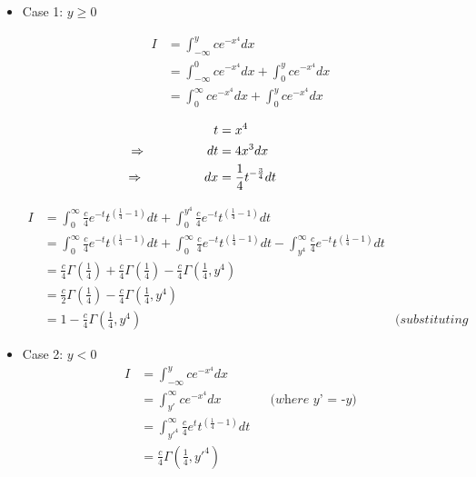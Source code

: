 \documentclass{article}
\theoremstyle{remark}
\begin{document}
\begin{itemize}

\item \large{Case 1: $y\geq 0$}

\begin{align*}
    I &= \int_{-\infty}^{y} c e^{-x^{4}} dx \\
    &= \int_{-\infty}^{0} c e^{-x^{4}} dx + \int_{0}^{y} c e^{-x^{4}} dx \\
    &= \int_{0}^{\infty} c e^{-x^{4}} dx + \int_{0}^{y} c e^{-x^{4}} dx \\
\end{align*}
\begin{align*}
  t&=x^4 \\
  \llap{$\Rightarrow$\hspace{50pt}} dt&=4x^3dx\\
  \llap{$\Rightarrow$\hspace{50pt}} dx &= \frac{1}{4} t^{-\frac{3}{4}} dt
\end{align*}

\begin{align*}
    I &= \int_{0}^{\infty} \frac{c}{4} e^{-t} t^{(\frac{1}{4}-1)} dt + \int_{0}^{y^4} \frac{c}{4} e^{-t} t^{(\frac{1}{4}-1)} dt\\
     &= \int_{0}^{\infty} \frac{c}{4} e^{-t} t^{(\frac{1}{4}-1)} dt+ \int_{0}^{\infty} \frac{c}{4} e^{-t} t^{(\frac{1}{4}-1)} dt - \int_{y^4}^{\infty} \frac{c}{4} e^{-t} t^{(\frac{1}{4}-1)} dt\\
     &= \frac{c}{4} \Gamma(\frac{1}{4}) + \frac{c}{4} \Gamma(\frac{1}{4}) - \frac{c}{4} \Gamma(\frac{1}{4},y^4)\\
     &= \frac{c}{2}\Gamma(\frac{1}{4}) - \frac{c}{4} \Gamma(\frac{1}{4},y^4) \\
     &= 1 - \frac{c}{4} \Gamma(\frac{1}{4},y^4) &\textit{(substituting c)}
\end{align*}

\item \large{Case 2: $y < 0$}
\begin{align*}
    I &= \int_{-\infty}^{y} c e^{-x^{4}} dx \\
    &= \int_{{y}'}^{\infty} c e^{-x^{4}} dx &&\textit{(where {y}' = -y)}\\
    &= \int_{{y}'^4}^{\infty} \frac{c}{4} e^{t} t^{(\frac{1}{4}-1)} dt \\
    &= \frac{c}{4} \Gamma(\frac{1}{4},{y}'^4)
\end{align*}

\end{itemize}
\end{document}
